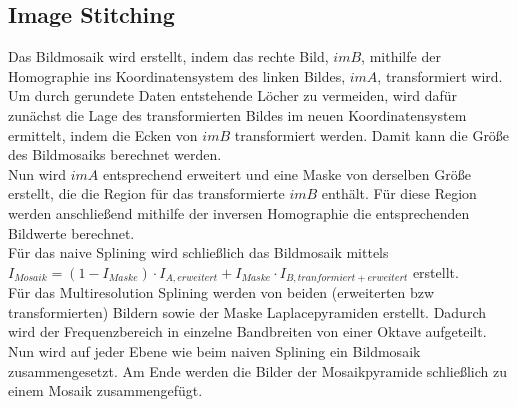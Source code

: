\documentclass[deutsch]{scrartcl}
\begin{document}
\subsection{Image Stitching}
Das Bildmosaik wird erstellt, indem das rechte Bild, $imB$, mithilfe der Homographie ins Koordinatensystem des linken Bildes, $imA$, transformiert wird. Um durch gerundete Daten entstehende Löcher zu vermeiden, wird dafür zunächst die Lage des transformierten Bildes im neuen Koordinatensystem ermittelt, indem die Ecken von $imB$ transformiert werden. Damit kann die Größe des Bildmosaiks berechnet werden.\\
Nun wird $imA$ entsprechend erweitert und eine Maske von derselben Größe erstellt, die die Region für das transformierte $imB$ enthält. Für diese Region werden anschließend mithilfe der inversen Homographie die entsprechenden Bildwerte berechnet. \\
Für das naive Splining wird schließlich das Bildmosaik mittels $I_{Mosaik}=(1-I_{Maske})\cdot I_{A,erweitert} + I_{Maske}\cdot I_{B,tranformiert+erweitert}$ erstellt. \\
Für das Multiresolution Splining\cite{spline83} werden von beiden (erweiterten bzw transformierten) Bildern sowie der Maske Laplacepyramiden erstellt. Dadurch wird der Frequenzbereich in einzelne Bandbreiten von einer Oktave aufgeteilt. Nun wird auf jeder Ebene wie beim naiven Splining ein Bildmosaik zusammengesetzt. Am Ende werden die Bilder der Mosaikpyramide schließlich zu einem Mosaik zusammengefügt.


\newpage
\end{document}
